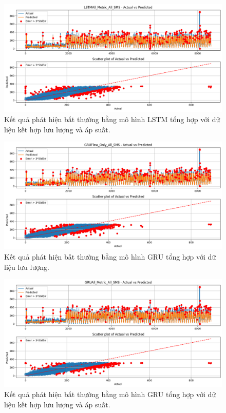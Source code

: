 \begin{figure}[htbp]
    \centering
    \includegraphics[width=\textwidth]{image/section6_3/anomaly_detection_combined_lstm_allmetric.png}
    \caption{Kết quả phát hiện bất thường bằng mô hình LSTM tổng hợp với dữ liệu kết hợp lưu lượng và áp suất.}
    \label{fig:anomaly_combined_lstm_all}
\end{figure}

\begin{figure}[htbp]
    \centering
    \includegraphics[width=\textwidth]{image/section6_3/anomaly_detection_combined_gru_flow.png}
    \caption{Kết quả phát hiện bất thường bằng mô hình GRU tổng hợp với dữ liệu lưu lượng.}
    \label{fig:anomaly_combined_gru_flow}
\end{figure}

\begin{figure}[htbp]
    \centering
    \includegraphics[width=\textwidth]{image/section6_3/anomaly_detection_combined_gru_allmetric.png}
    \caption{Kết quả phát hiện bất thường bằng mô hình GRU tổng hợp với dữ liệu kết hợp lưu lượng và áp suất.}
    \label{fig:anomaly_combined_gru_all}
\end{figure}

